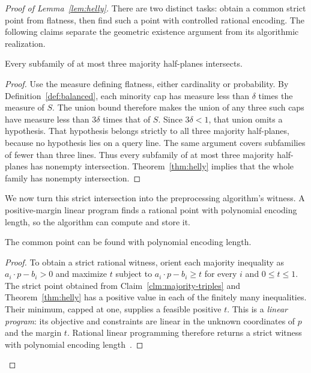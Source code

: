 \begin{proof}[Proof of Lemma~\ref{lem:helly}]
There are two distinct tasks: obtain a common strict point from
flatness, then find such a point with controlled rational encoding.
The following claims separate the geometric existence argument from
its algorithmic realization.

\begin{claim}
\label{clm:majority-triples}
Every subfamily of at most three majority half-planes intersects.
\end{claim}
\begin{proof}
Use the measure defining flatness, either cardinality or probability.
By Definition~\ref{def:balanced}, each minority cap has measure
less than $\delta$ times the measure of $S$. The union bound
therefore makes the union of any three such caps have measure
less than $3\delta$ times that of $S$. Since $3\delta<1$,
that union omits a hypothesis.
That hypothesis belongs strictly to all three majority half-planes,
because no hypothesis lies on a query line. The same argument covers
subfamilies of fewer than three lines. Thus every subfamily of at
most three majority half-planes has nonempty intersection.
Theorem~\ref{thm:helly} implies
that the whole family has nonempty intersection.
\end{proof}

We now turn this strict intersection into the preprocessing algorithm's
witness. A positive-margin linear program finds a rational point with
polynomial encoding length, so the algorithm can compute and store it.

\begin{claim}
\label{clm:rational-witness}
The common point can be found with polynomial encoding length.
\end{claim}
\begin{proof}
To obtain a strict rational witness, orient each majority inequality
as $a_i\cdot p-b_i>0$ and maximize $t$ subject to
$a_i\cdot p-b_i\ge t$ for every $i$ and $0\le t\le1$.
The strict point obtained from Claim~\ref{clm:majority-triples}
and Theorem~\ref{thm:helly} has a positive value in each of the
finitely many inequalities. Their minimum, capped at one, supplies
a feasible positive $t$.
This is a \emph{linear program}: its objective and constraints
are linear in the unknown coordinates of $p$ and the margin $t$.
Rational linear programming therefore returns a strict witness
with polynomial encoding length~\cite{khachiyan1979}.
\end{proof}
\end{proof}

